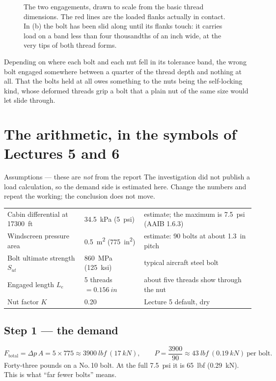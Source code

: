 \documentclass[11pt,a4paper]{article}
\begin{document}
\begin{figure}[H]\centering
\resizebox{\textwidth}{!}{}
\caption{The two engagements, drawn to scale from the basic thread dimensions. The red lines are the loaded flanks actually in contact. In (b) the bolt
has been slid along until its flanks touch: it carries load on a band less than four thousandths
of an inch wide, at the very tips of both thread forms.}
\label{fig:thread}
\end{figure}

Depending on where each bolt and each nut fell in its tolerance band, the wrong bolt engaged
somewhere between a quarter of the thread depth and nothing at all. That the bolts held at all owes
something to the nuts being the self-locking kind, whose deformed threads grip a bolt that a plain
nut of the same size would let slide through.

\section{The arithmetic, in the symbols of Lectures 5 and 6}
\label{sec:arith}

\begin{aerobox}{Assumptions --- these are \emph{not} from the report}
The investigation did not publish a load calculation, so the demand side is estimated here. Change
the numbers and repeat the working; the conclusion does not move.

\smallskip
{\small
\begin{tabular}{@{}lll@{}}
Cabin differential at \SI{17300}{ft} & \SI{34.5}{kPa} (\SI{5}{psi}) & estimate; the maximum is \SI{7.5}{psi} (AAIB 1.6.3)\\
Windscreen pressure area & \SI{0.5}{m^2} (\SI{775}{in^2}) & estimate: 90 bolts at about \SI{1.3}{in} pitch\\
Bolt ultimate strength $S_{ut}$ & \SI{860}{MPa} (\SI{125}{ksi}) & typical aircraft steel bolt\\
Engaged length $L_e$ & 5 threads $=\SI{0.156}{in}$ & about five threads show through the nut\\
Nut factor $K$ & 0.20 & Lecture 5 default, dry\\
\end{tabular}}
\end{aerobox}

\subsection*{Step 1 --- the demand}
\[
F_{\text{total}}=\Delta p\,A=5\times775\approx\SI{3900}{lbf}\ (\SI{17}{kN}),\qquad
P=\frac{3900}{90}\approx\SI{43}{lbf}\ (\SI{0.19}{kN})\ \text{per bolt}.
\]
Forty-three pounds on a No.\,10 bolt. At the full \SI{7.5}{psi} it is \SI{65}{lbf}
(\SI{0.29}{kN}). This is what ``far fewer bolts'' means.
\end{document}
